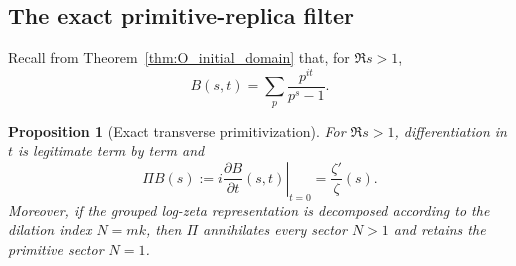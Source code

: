 \documentclass[11pt]{amsart}
\numberwithin{equation}{section}
\theoremstyle{plain}
\newtheorem{proposition}[theorem]{Proposition}
\theoremstyle{definition}
\theoremstyle{remark}
\begin{document}
\subsection{The exact primitive-replica filter}
\label{subsec:primitive_replica_filter}

Recall from Theorem~\ref{thm:O_initial_domain} that, for \(\Re s>1\),
\begin{equation}
B(s,t)=\sum_p\frac{p^{it}}{p^s-1}.
\label{eq:B_prime_series_recalled_kernel}
\end{equation}

\begin{proposition}[Exact transverse primitivization]
\label{prop:transverse_primitivization_kernel}
For \(\Re s>1\), differentiation in \(t\) is legitimate term by term and
\begin{equation}
\boxed{
\Pi B(s):=
 i\left.\frac{\partial B}{\partial t}(s,t)\right|_{t=0}
=\frac{\zeta'}{\zeta}(s).}
\label{eq:Pi_B_log_derivative}
\end{equation}
Moreover, if the grouped log-zeta representation is decomposed according to
the dilation index \(N=mk\), then \(\Pi\) annihilates every sector
\(N>1\) and retains the primitive sector \(N=1\).
\end{proposition}
\end{document}
